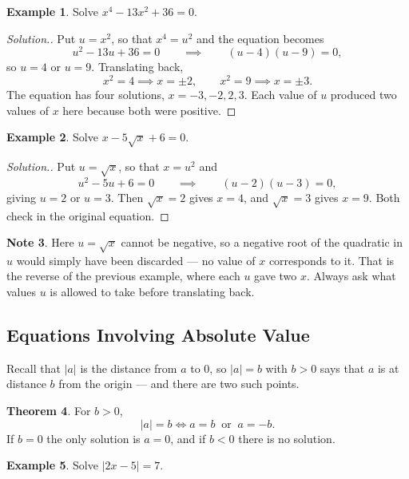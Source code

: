 \documentclass[11pt,a4paper]{article}
\theoremstyle{definition}
\newtheorem{thm}{Theorem}[section]
\newtheorem{example}[thm]{Example}
\newtheorem{note}[thm]{Note}
\newenvironment{solution}
  {\renewcommand{\qedsymbol}{}\begin{proof}[\textit{Solution}.]}
  {\end{proof}}
\begin{document}
\begin{example}
Solve $x^{4}-13x^{2}+36=0$.
\end{example}

\begin{solution}
Put $u=x^{2}$, so that $x^{4}=u^{2}$ and the equation becomes
$$u^{2}-13u+36=0 \qquad\implies\qquad (u-4)(u-9)=0,$$
so $u=4$ or $u=9$. Translating back,
$$x^{2}=4 \implies x=\pm2, \qquad x^{2}=9 \implies x=\pm3 .$$
The equation has four solutions, $x=-3,-2,2,3$. Each value of $u$ produced two
values of $x$ here because both were positive.
\end{solution}

\begin{example}
Solve $x-5\sqrt{x}+6=0$.
\end{example}

\begin{solution}
Put $u=\sqrt{x}$, so that $x=u^{2}$ and
$$u^{2}-5u+6=0 \qquad\implies\qquad (u-2)(u-3)=0,$$
giving $u=2$ or $u=3$. Then $\sqrt{x}=2$ gives $x=4$, and $\sqrt{x}=3$ gives
$x=9$. Both check in the original equation.
\end{solution}

\begin{note}
Here $u=\sqrt{x}$ cannot be negative, so a negative root of the quadratic in $u$
would simply have been discarded --- no value of $x$ corresponds to it. That is
the reverse of the previous example, where each $u$ gave two $x$. Always ask
what values $u$ is allowed to take before translating back.
\end{note}

\subsection{Equations Involving Absolute Value}

Recall that $\left|a\right|$ is the distance from $a$ to $0$, so
$\left|a\right|=b$ with $b>0$ says that $a$ is at distance $b$ from the origin
--- and there are two such points.

\begin{thm}
\label{thm:absequation}
For $b>0$,
$$\left|a\right|=b \iff a=b \ \text{ or } \ a=-b .$$
If $b=0$ the only solution is $a=0$, and if $b<0$ there is no solution.
\end{thm}

\begin{example}
Solve $\left|2x-5\right|=7$.
\end{example}
\end{document}
